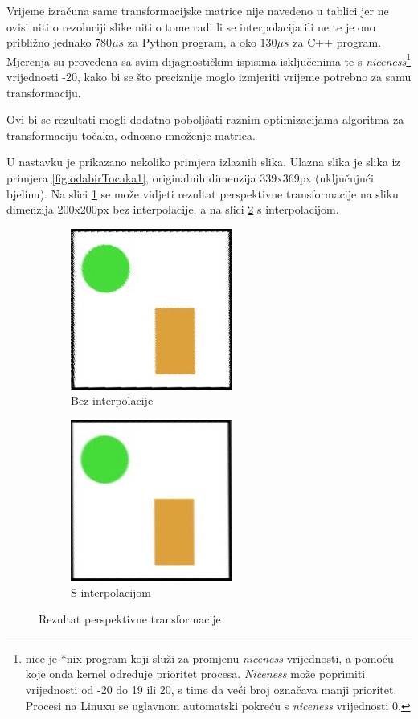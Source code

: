 Vrijeme izračuna same transformacijske matrice nije navedeno u tablici jer ne ovisi niti o rezoluciji slike niti o tome radi li se interpolacija ili ne te je ono približno jednako $780 \mu s$ za Python program, a oko $130\mu s$ za C++ program. Mjerenja su provedena sa svim dijagnostičkim ispisima isključenima te s \emph{niceness}\footnote{nice je *nix program koji služi za promjenu \emph{niceness} vrijednosti, a pomoću koje onda kernel određuje prioritet procesa. \emph{Niceness} može poprimiti vrijednosti od -20 do 19 ili 20, s time da veći broj označava manji prioritet. Procesi na Linuxu se uglavnom automatski pokreću s \emph{niceness} vrijednosti 0.} vrijednosti -20, kako bi se što preciznije moglo izmjeriti vrijeme potrebno za samu transformaciju.

Ovi bi se rezultati mogli dodatno poboljšati raznim optimizacijama algoritma za transformaciju točaka, odnosno množenje matrica.

U nastavku je prikazano nekoliko primjera izlaznih slika. Ulazna slika je slika iz primjera \ref{fig:odabirTocaka1}, originalnih dimenzija 339x369px (uključujući bjelinu). Na slici \ref{fig:primjer3_noint} se može vidjeti rezultat perspektivne transformacije na sliku dimenzija 200x200px bez interpolacije, a na slici \ref{fig:primjer3_int} s interpolacijom.

\begin{figure}[ht]
\centering

\begin{subfigure}{\textwidth}
	\centering
	\includegraphics[scale=1]{figures/sample3_200_noint.jpg}
	\caption{Bez interpolacije}
	\label{fig:primjer3_noint}
\end{subfigure}
\begin{subfigure}{\textwidth}
	\centering
	\includegraphics[scale=1]{figures/sample3_200_int.jpg}
	\caption{S interpolacijom}
	\label{fig:primjer3_int}
\end{subfigure}

\caption{Rezultat perspektivne transformacije}
\label{fig:primjer3}
\end{figure}

